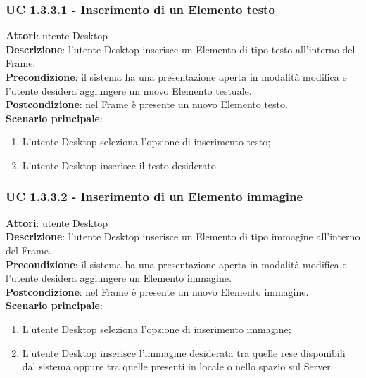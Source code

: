 \subsubsection{UC 1.3.3.1 - Inserimento di un Elemento testo}{
	\label{uc1.3.3.1}
	\textbf{Attori}: utente Desktop \\
	\textbf{Descrizione}: l'utente Desktop inserisce un Elemento di tipo testo all'interno del Frame. \\
	\textbf{Precondizione}: il sistema ha una presentazione aperta in modalità modifica e l'utente desidera aggiungere un nuovo Elemento testuale.	\\
	\textbf{Postcondizione}: nel Frame è presente un nuovo Elemento testo.	\\
	\textbf{Scenario principale}:
	\begin{enumerate}
		\item L'utente Desktop seleziona l'opzione di inserimento testo;
		\item L'utente Desktop inserisce il testo desiderato.
	\end{enumerate}
	}
\subsubsection{UC 1.3.3.2 - Inserimento di un Elemento immagine}{
	\label{uc1.3.3.2}
	\textbf{Attori}: utente Desktop \\
	\textbf{Descrizione}: l'utente Desktop inserisce un Elemento di tipo immagine all'interno del Frame. \\
	\textbf{Precondizione}: il sistema ha una presentazione aperta in modalità modifica e l'utente desidera aggiungere un Elemento immagine.	\\
	\textbf{Postcondizione}: nel Frame è presente un nuovo Elemento immagine.	\\
	\textbf{Scenario principale}:
	\begin{enumerate}
		\item L'utente Desktop seleziona l'opzione di inserimento immagine;
		\item L'utente Desktop inserisce l'immagine desiderata tra quelle rese disponibili dal sistema oppure tra quelle presenti in locale o nello spazio sul Server.
	\end{enumerate}
	}
